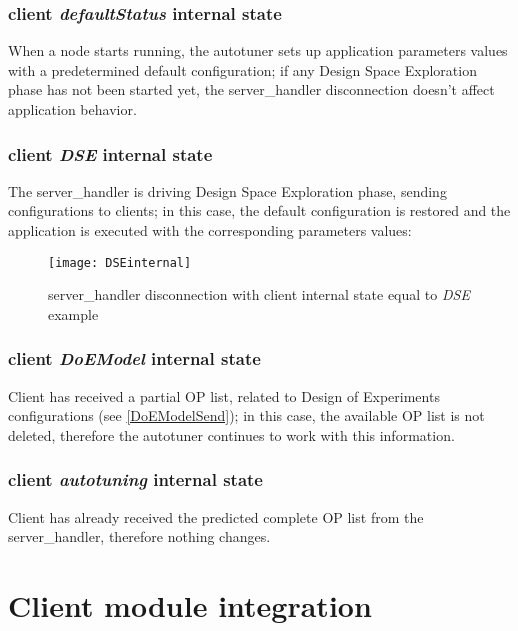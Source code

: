 \subsubsection{client \textit{defaultStatus} internal state}

When a node starts running, the autotuner sets up application parameters values with a predetermined default configuration; if any Design Space Exploration phase has not been started yet, the server\_handler disconnection doesn't affect application behavior.


\subsubsection{client \textit{DSE} internal state}

The server\_handler is driving Design Space Exploration phase, sending configurations to clients; in this case, the default configuration is restored and the application is executed with the corresponding parameters values:

\begin{figure}[H]

    \centering
    \texttt{[image: DSEinternal]}
    \caption{server\_handler disconnection with client internal state equal to \textit{DSE} example}
    
\end{figure}


\subsubsection{client \textit{DoEModel} internal state}

Client has received a partial OP list, related to Design of Experiments configurations (see \ref{DoEModelSend}); in this case, the available OP list is not deleted, therefore the autotuner continues to work with this information.


\subsubsection{client \textit{autotuning} internal state}

Client has already received the predicted complete OP list from the server\_handler, therefore nothing changes.





\section{Client module integration}

